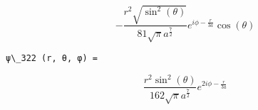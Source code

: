 \documentclass[11pt]{article}
\begin{document}
    $$- \frac{r^{2} \sqrt{\sin^{2}{\left (\theta \right )}}}{81 \sqrt{\pi} a^{\frac{7}{2}}} e^{i \phi - \frac{r}{3 a}} \cos{\left (\theta \right )}$$

    
    \begin{Verbatim}[commandchars=\\\{\}]
ψ\_322 (r, θ, φ) =

    \end{Verbatim}

    $$\frac{r^{2} \sin^{2}{\left (\theta \right )}}{162 \sqrt{\pi} a^{\frac{7}{2}}} e^{2 i \phi - \frac{r}{3 a}}$$

    
    \begin{Verbatim}[commandchars=\\\{\}]


    \end{Verbatim}


    
    
    
    
\end{document}
